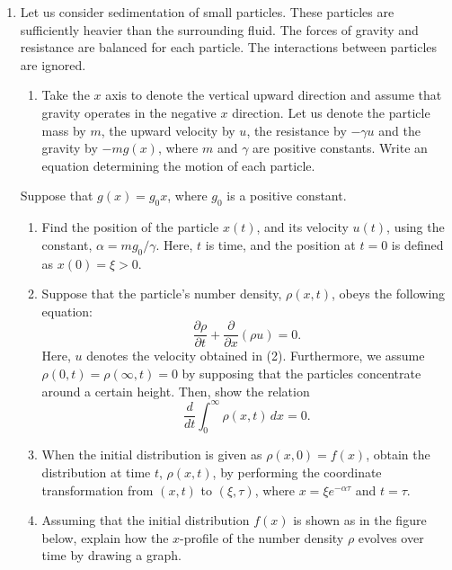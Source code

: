 \documentclass{article}
\begin{document}
\begin{enumerate}[label=\fbox{\arabic*}]
  \item Let us consider sedimentation of small particles. These particles are sufficiently heavier than the surrounding fluid. The forces of gravity and resistance are balanced for each particle. The interactions between particles are ignored.
        \begin{enumerate}[label=(\arabic*)]
          \item Take the $x$ axis to denote the vertical upward direction and assume that gravity operates in the negative $x$ direction. Let us denote the particle mass by $m$, the upward velocity by $u$, the resistance by $-\gamma u$ and the gravity by $-mg(x)$, where $m$ and $\gamma$ are positive constants. Write an equation determining the motion of each particle.
        \end{enumerate}
        Suppose that $g(x) = g_0 x$, where $g_0$ is a positive constant.
        \begin{enumerate}[label=(\arabic*), resume]
          \item Find the position of the particle $x(t)$, and its velocity $u(t)$, using the constant, $\alpha = m g_0 / \gamma$. Here, $t$ is time, and the position at $t = 0$ is defined as $x(0) = \xi > 0$.
          \item Suppose that the particle's number density, $\rho(x, t)$, obeys the following equation:
                \[
                  \frac{\partial \rho}{\partial t} + \frac{\partial}{\partial x}(\rho u) = 0.
                \]
                Here, $u$ denotes the velocity obtained in (2). Furthermore, we assume $\rho(0, t) = \rho(\infty, t) = 0$ by supposing that the particles concentrate around a certain height. Then, show the relation
                \[
                  \frac{d}{dt} \int_0^\infty \rho(x, t) \, dx = 0.
                \]
          \item When the initial distribution is given as $\rho(x, 0) = f(x)$, obtain the distribution at time $t$, $\rho(x, t)$, by performing the coordinate transformation from $(x, t)$ to $(\xi, \tau)$, where $x = \xi e^{-\alpha \tau}$ and $t = \tau$.
          \item Assuming that the initial distribution $f(x)$ is shown as in the figure below, explain how the $x$-profile of the number density $\rho$ evolves over time by drawing a graph.
                \begin{center}
                \end{center}
        \end{enumerate}


\end{enumerate}
\end{document}
